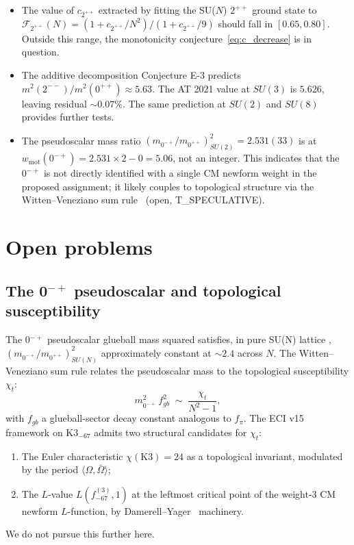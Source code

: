 \documentclass[11pt,a4paper]{amsart}
\theoremstyle{definition}
\begin{document}
\begin{itemize}\setlength\itemsep{2pt}
\item The value of $c_{2^{++}}$ extracted by fitting the SU($N$) $2^{++}$ ground
      state to $\mathcal{F}_{2^{++}}(N) = (1 + c_{2^{++}}/N^{2})/(1 + c_{2^{++}}/9)$
      should fall in $[0.65, 0.80]$. Outside this range, the monotonicity
      conjecture~\eqref{eq:c_decrease} is in question.
\item The additive decomposition Conjecture E-3 predicts
      $m^{2}(2^{--})/m^{2}(0^{++}) \approx 5.63$. The AT 2021 value at $SU(3)$ is
      $5.626$, leaving residual $\sim 0.07\%$. The same prediction at $SU(2)$ and
      $SU(8)$ provides further tests.
\item The pseudoscalar mass ratio $(m_{0^{-+}}/m_{0^{++}})^{2}_{SU(2)} = 2.531(33)$
      is at $w_{\mathrm{mot}}(0^{-+}) = 2.531 \times 2 - 0 = 5.06$, not an integer.
      This indicates that the $0^{-+}$ is not directly identified with a single
      CM newform weight in the proposed assignment; it likely couples to
      topological structure via the Witten--Veneziano sum rule~\cite{Witten1979b}
      (open, T\_SPECULATIVE).
\end{itemize}

\section{Open problems}\label{sec:open}

\subsection{The 0$^{-+}$ pseudoscalar and topological susceptibility}

The 0$^{-+}$ pseudoscalar glueball mass squared satisfies, in pure SU(N) lattice
\cite[Table 35]{AthenodorouTeper2021}, $(m_{0^{-+}}/m_{0^{++}})^{2}_{SU(N)}$
approximately constant at $\sim 2.4$ across $N$. The Witten--Veneziano
sum rule \cite{Witten1979b,Veneziano1979} relates the pseudoscalar mass to the
topological susceptibility $\chi_{t}$:
\begin{equation}\label{eq:WV}
m_{0^{-+}}^{2} \,f_{gb}^{2} \;\sim\; \frac{\chi_{t}}{N^{2} - 1},
\end{equation}
with $f_{gb}$ a glueball-sector decay constant analogous to $f_{\pi}$. The
ECI v15 framework on $\mathrm{K3}_{-67}$ admits two structural candidates for
$\chi_{t}$:
\begin{enumerate}\setlength\itemsep{2pt}
\item The Euler characteristic $\chi(\mathrm{K3}) = 24$ as a topological
      invariant, modulated by the period $\langle \Omega, \bar\Omega \rangle$;
\item The $L$-value $L(f_{-67}^{(3)}, 1)$ at the leftmost critical point of the
      weight-$3$ CM newform $L$-function, by Damerell--Yager~\cite{Yager1982}
      machinery.
\end{enumerate}
We do not pursue this further here.
\end{document}
